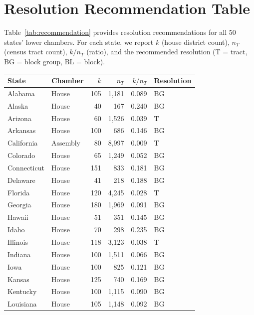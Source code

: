 \section{Resolution Recommendation Table}
\label{sec:table}

Table~\ref{tab:recommendation} provides resolution recommendations for all
50 states' lower chambers. For each state, we report $k$ (house district count),
$n_T$ (census tract count), $k/n_T$ (ratio), and the recommended resolution
(T = tract, BG = block group, BL = block).

\begin{table}[h]
\centering\scriptsize
\begin{tabular}{llrrrl}
\toprule
State & Chamber & $k$ & $n_T$ & $k/n_T$ & Resolution \\
\midrule
Alabama      & House        & 105 & 1{,}181 & 0.089 & BG \\
Alaska       & House        & 40  & 167   & 0.240 & BG \\
Arizona      & House        & 60  & 1{,}526 & 0.039 & T \\
Arkansas     & House        & 100 & 686   & 0.146 & BG \\
California   & Assembly     & 80  & 8{,}997 & 0.009 & T \\
Colorado     & House        & 65  & 1{,}249 & 0.052 & BG \\
Connecticut  & House        & 151 & 833   & 0.181 & BG \\
Delaware     & House        & 41  & 218   & 0.188 & BG \\
Florida      & House        & 120 & 4{,}245 & 0.028 & T \\
Georgia      & House        & 180 & 1{,}969 & 0.091 & BG \\
Hawaii       & House        & 51  & 351   & 0.145 & BG \\
Idaho        & House        & 70  & 298   & 0.235 & BG \\
Illinois     & House        & 118 & 3{,}123 & 0.038 & T \\
Indiana      & House        & 100 & 1{,}511 & 0.066 & BG \\
Iowa         & House        & 100 & 825   & 0.121 & BG \\
Kansas       & House        & 125 & 740   & 0.169 & BG \\
Kentucky     & House        & 100 & 1{,}115 & 0.090 & BG \\
Louisiana    & House        & 105 & 1{,}148 & 0.092 & BG \\

\end{tabular}
\end{table}
